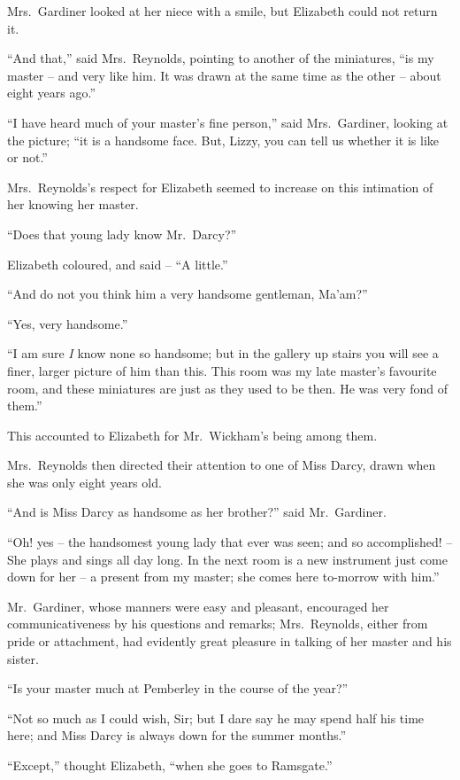 Mrs.\ Gardiner looked at her niece with a smile, but
Elizabeth could not return it.

“And that,” said Mrs.\ Reynolds, pointing to another
of the miniatures, “is my master -- and very like him.
It was drawn at the same time as the other -- about eight
years ago.”

“I have heard much of your master’s fine person,”
said Mrs.\ Gardiner, looking at the picture; “it is a handsome
face. But, Lizzy, you can tell us whether it is like
or not.”

Mrs.\ Reynolds’s respect for Elizabeth seemed to increase
on this intimation of her knowing her master.

“Does that young lady know Mr.\ Darcy?”

Elizabeth coloured, and said -- “A little.”

“And do not you think him a very handsome gentleman,
Ma’am?”

“Yes, very handsome.”

“I am sure \textit{I} know none so handsome; but in the
gallery up stairs you will see a finer, larger picture of him
than this. This room was my late master’s favourite
room, and these miniatures are just as they used to be
then. He was very fond of them.”

This accounted to Elizabeth for Mr.\ Wickham’s being
among them.

Mrs.\ Reynolds then directed their attention to one of
Miss Darcy, drawn when she was only eight years old.

“And is Miss Darcy as handsome as her bro\-ther?”
said Mr.\ Gardiner.

“Oh! yes -- the handsomest young lady that ever was
seen; and so accomplished! -- She plays and sings all day
long. In the next room is a new instrument just come
down for her -- a present from my master; she comes here
to-morrow with him.”

Mr.\ Gardiner, whose manners were easy and pleasant,
encouraged her communicativeness by his questions and
remarks; Mrs.\ Reynolds, either from pride or attachment,
had evidently great pleasure in talking of her
master and his sister.

“Is your master much at Pemberley in the course of
the year?”

“Not so much as I could wish, Sir; but I dare say he
may spend half his time here; and Miss Darcy is always
down for the summer months.”

“Except,” thought Elizabeth, “when she goes to
Ramsgate.”

